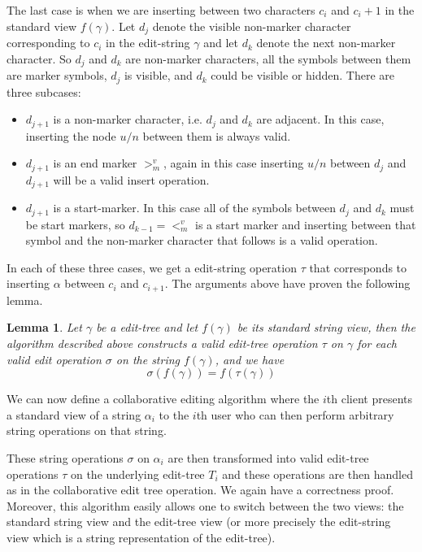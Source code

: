 \documentclass{amsart}
\newtheorem{lemma}[theorem]{Lemma}
\begin{document}
The last case is when we are inserting between two characters $c_i$ and $c{_i+1}$
in the standard view $f(\gamma)$. Let $d_j$ denote the visible non-marker
character corresponding to $c_i$ in the edit-string $\gamma$ and let
$d_k$ denote the next non-marker character. So $d_j$ and $d_k$ are non-marker
characters, all the symbols between them are marker symbols, $d_j$ is
visible, and $d_k$ could be visible or hidden. There are three subcases:
\begin{itemize} 
\item $d_{j+1}$ is a non-marker character, i.e. $d_j$ and $d_k$ are adjacent. 
In this case, inserting
the node $u/n$ between them is always valid.
\item $d_{j+1}$ is an end marker $>^v_m$, again in this case inserting $u/n$
between $d_j$ and $d_{j+1}$ will be a valid insert operation.
\item $d_{j+1}$ is a start-marker. In this case all of the symbols between
$d_j$ and $d_k$ must be start markers, so $d_{k-1} = <^v_m$ is a start marker
and inserting between that symbol and the non-marker character that follows
is a valid operation.
\end{itemize}
In each of these three cases, we get a edit-string operation $\tau$ that
corresponds to inserting $\alpha$ between $c_i$ and $c_{i+1}$. The arguments
above have proven the following lemma.


\begin{lemma}
Let $\gamma$ be a edit-tree and let $f(\gamma)$ be its standard string view, then
the algorithm described above constructs a valid edit-tree operation $\tau$
on $\gamma$ for each valid edit operation $\sigma$ on the string $f(\gamma)$, and
we have
\[
\sigma(f(\gamma)) = f(\tau(\gamma))
\]
\end{lemma}


We can now define a
collaborative editing algorithm where the $i$th client presents 
a standard view of a
string $\alpha_i$
to the $i$th user who can then perform arbitrary string
operations on that string.

These string operations $\sigma$ on $\alpha_i$ 
are then transformed into valid edit-tree operations $\tau$
on the underlying edit-tree $T_i$ and these operations are then handled as in the
collaborative edit tree operation. We again have a correctness proof. Moreover, 
this algorithm easily allows one to switch between the two  views: 
the standard string view and the edit-tree view (or more precisely the
edit-string view which is a string representation of the edit-tree).
\end{document}
